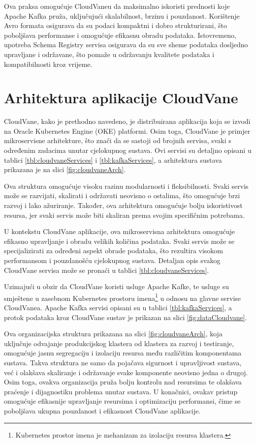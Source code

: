\documentclass[times, utf8, diplomski]{fer}
\begin{document}
Ova praksa omogućuje CloudVaneu da maksimalno iskoristi prednosti koje Apache Kafka pruža, uključujući skalabilnost, brzinu i pouzdanost. Korištenje Avro formata osigurava da su podaci kompaktni i dobro strukturirani, što poboljšava performanse i omogućuje efikasnu obradu podataka. Istovremeno, upotreba Schema Registry servisa osigurava da su sve sheme podataka dosljedno upravljane i održavane, što pomaže u održavanju kvalitete podataka i kompatibilnosti kroz vrijeme.

\clearpage
\section{Arhitektura aplikacije CloudVane}
\label{sec:architecture}

CloudVane, kako je prethodno navedeno, je distribuirana aplikacija koja se izvodi na Oracle Kubernetes Engine (OKE) platformi. Osim toga, CloudVane je primjer mikroservisne arhitekture, što znači da se sastoji od brojnih servisa, svaki s određenim zadacima unutar cjelokupnog sustava. Ovi servisi su detaljno opisani u tablici \ref{tbl:cloudvaneServices} i \ref{tbl:kafkaServices}, a arhitektura sustava prikazana je na slici \ref{fig:cloudvaneArch}.

Ova struktura omogućuje visoku razinu modularnosti i fleksibilnosti. Svaki servis može se razvijati, skalirati i održavati neovisno o ostalima, što omogućuje brzi razvoj i lako ažuriranje. Također, ova arhitektura omogućuje bolju iskoristivost resursa, jer svaki servis može biti skaliran prema svojim specifičnim potrebama.

U kontekstu CloudVane aplikacije, ova mikroservisna arhitektura omogućuje efikasno upravljanje i obradu velikih količina podataka. Svaki servis može se specijalizirati za određeni aspekt obrade podataka, što rezultira visokom performansom i pouzdanošću cjelokupnog sustava. Detaljan opis svakog CloudVane servisa može se pronaći u tablici \ref{tbl:cloudvaneServices}.

Uzimajući u obzir da CloudVane koristi usluge Apache Kafke, te usluge su smještene u zasebnom Kubernetes prostoru imena\footnote{Kubernetes prostor imena  je mehanizam za izolaciju resursa klastera.}  u odnosu na glavne servise CloudVanea. Apache Kafka servisi opisani su u tablici \ref{tbl:kafkaServices}, a protok podataka kroz CloudVane sustav je prikazan na slici \ref{fig:dataCloudvane}.

Ova organizacijska struktura prikazana na slici \ref{fig:cloudvaneArch}, koja uključuje odvajanje produkcijskog klastera od klastera za razvoj i testiranje, omogućuje jasnu segregaciju i izolaciju resursa među različitim komponentama sustava. Takva struktura ne samo da pojačava sigurnost i upravljivost sustava, već i olakšava skaliranje i održavanje svake komponente neovisno jedna o drugoj. Osim toga, ovakva organizacija pruža bolju kontrolu nad resursima te olakšava praćenje i dijagnostiku problema unutar sustava. U konačnici, ovakav pristup omogućuje efikasnije upravljanje resursima i optimizaciju performansi, čime se poboljšava ukupna pouzdanost i efikasnost CloudVane aplikacije.
\end{document}

